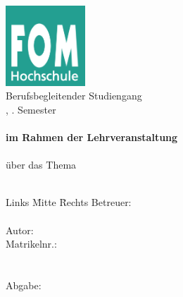 \begin{titlepage}
	\begin{center}
		\textbf{\myHochschulName}\\
		\textbf{\myHochschulStandort}\\
		\vspace{1.5cm}
			\includegraphics[width=3cm]{Abbildungen/fom_logo.png} \\
		\vspace{1cm}
		Berufsbegleitender Studiengang\\
		\myStudiengang, \mySemesterZahl. Semester\\
		\vspace{1cm}
		\textbf{\myThesisArt}\\
		\textbf{im Rahmen der Lehrveranstaltung}\\
		\textbf{\myLehrveranstaltung}\\
		\vspace{1cm}
		über das Thema\\
		\Huge{\myTitel}\\
		\vspace{0.2cm}
	\end{center}
	\normalsize
	\vfill
	\begin{tabbing}
		Links \= Mitte \= Rechts\kill
		Betreuer: \> \> \myBetreuer\\
		\> \> \\

		Autor: \> \> \myAutor\\
		\> \>  Matrikelnr.: \myMatrikelNr\\
		\> \> \myAdresse\\
		\> \> \\
		Abgabe: \> \> \myAbgabeDatum
	\end{tabbing}
\end{titlepage}